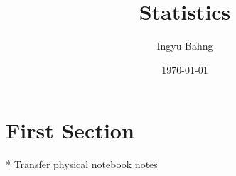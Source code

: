 \documentclass[10pt]{article}
\title{Statistics}
\date{\today}
\author{Ingyu Bahng}
\begin{document}


\section{First Section}

* Transfer physical notebook notes
  
\end{document}
